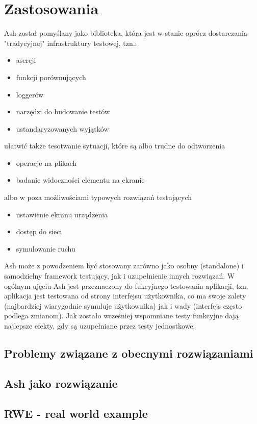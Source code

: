 \documentclass[a4paper]{article}
\begin{document}
\section{Zastosowania}
Ash został pomyślany jako biblioteka, która jest w stanie oprócz dostarczania "tradycyjnej" infrastruktury testowej, tzn.:
\begin{itemize}
  \item asercji
  \item funkcji porównujących
  \item loggerów
  \item narzędzi do budowanie testów
  \item ustandaryzowanych wyjątków
\end{itemize}
ułatwić także tesotwanie sytuacji, które są albo trudne do odtworzenia
\begin{itemize}
  \item operacje na plikach
  \item badanie widoczności elementu na ekranie
\end{itemize}
 albo w poza możliwościami typowych rozwiązań testujących
\begin{itemize}
  \item ustawienie ekranu urządzenia
  \item dostęp do sieci
  \item symulowanie ruchu
\end{itemize}
Ash może z powodzeniem być stosowany zarówno jako osobny (standalone) i samodzielny framework testujący, jak i uzupełnienie innych rozwiązań. W ogólnym ujęciu Ash jest przeznaczony do fukcyjnego testowania aplikacji, tzn. aplikacja jest testowana od strony interfejsu użytkownika, co ma swoje zalety (najbardziej wiarygodnie symuluje użytkownika) jak i wady (interfejs często podlega zmianom). Jak zostało wcześniej wspomniane testy funkcyjne dają najlepsze efekty, gdy są uzupełniane przez testy jednostkowe.  

\subsection{Problemy związane z obecnymi rozwiązaniami}

\subsection{Ash jako rozwiązanie}

\subsection{RWE - real world example}
\end{document}
